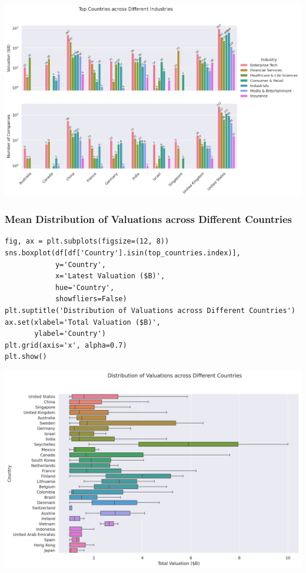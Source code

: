 \documentclass[a4paper,12pt]{article}
\begin{document}
\begin{center}
\includegraphics[width=.9\linewidth]{./.ob-jupyter/33900e6d5fea2d6aa2730af6c08c1029c0b26b20.png}
\label{}
\end{center}
\subsubsection{Mean Distribution of Valuations across Different Countries}
\label{sec:org5d2d9cd}

\begin{verbatim}
fig, ax = plt.subplots(figsize=(12, 8))
sns.boxplot(df[df['Country'].isin(top_countries.index)],
            y='Country',
            x='Latest Valuation ($B)',
            hue='Country',
            showfliers=False)
plt.suptitle('Distribution of Valuations across Different Countries')
ax.set(xlabel='Total Valuation ($B)',
       ylabel='Country')
plt.grid(axis='x', alpha=0.7)
plt.show()
\end{verbatim}

\begin{center}
\includegraphics[width=.9\linewidth]{./.ob-jupyter/39fd31b873ab703c2f80e4c7c699be49ab648904.png}
\label{}
\end{center}
\end{document}
